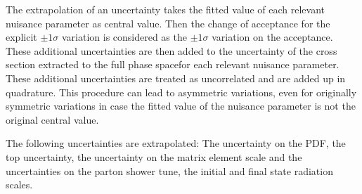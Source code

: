 The extrapolation of an uncertainty takes the fitted value of each relevant nuisance parameter as central value. Then the change of acceptance for the explicit $\pm 1 \sigma$ variation is considered as the $\pm 1 \sigma$ variation on the acceptance. These additional uncertainties are then added to the uncertainty of the cross section extracted to the full phase spacefor each relevant nuisance parameter. These additional uncertainties are treated as uncorrelated and are added up in quadrature. This procedure can lead to asymmetric variations, even for originally symmetric variations in case the fitted value of the nuisance parameter is not the original central value.

The following uncertainties are extrapolated:
The uncertainty on the PDF, the top \pt uncertainty, the uncertainty on the matrix element scale and the uncertainties on the parton shower tune, the initial and final state radiation scales.



